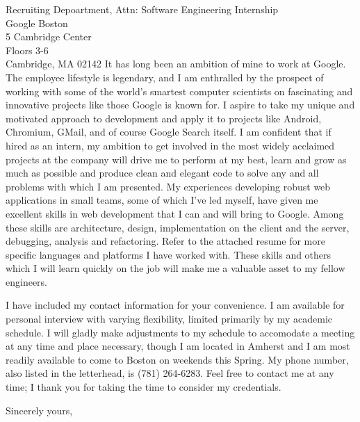 \documentclass{letter} %
\begin{document}
\begin{letter}{Recruiting Depoartment, Attn: Software Engineering Internship \\
Google Boston \\
5 Cambridge Center \\
Floors 3-6 \\
Cambridge, MA 02142}
\noindent It has long been an ambition of mine to work at Google.  The employee lifestyle is legendary, and I am enthralled by the prospect of working with some of the world's smartest computer scientists on fascinating and innovative projects like those Google is known for.  I aspire to take my unique and motivated approach to development and apply it to projects like Android, Chromium, GMail, and of course Google Search itself.  I am confident that if hired as an intern, my ambition to get involved in the most widely acclaimed projects at the company will drive me to perform at my best, learn and grow as much as possible and produce clean and elegant code to solve any and all problems with which I am presented.  My experiences developing robust web applications in small teams, some of which I've led myself, have given me excellent skills in web development that I can and will bring to Google.  Among these skills are architecture, design, implementation on the client and the server, debugging, analysis and refactoring.  Refer to the attached resume for more specific languages and platforms I have worked with.  These skills and others which I will learn quickly on the job will make me a valuable asset to my fellow engineers.


\noindent I have included my contact information for your convenience.  I am available for personal interview with varying flexibility, limited primarily by my academic schedule.  I will gladly make adjustments to my schedule to accomodate a meeting at any time and place necessary, though I am located in Amherst and I am most readily available to come to Boston on weekends this Spring.  My phone number, also listed in the letterhead, is (781) 264-6283.  Feel free to contact me at any time; I thank you for taking the time to consider my credentials.
 
\closing{Sincerely yours,} 
 

 

\end{letter}
 
\end{document}
